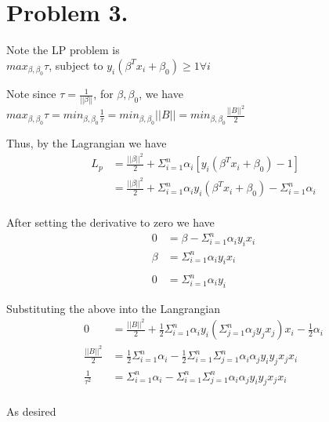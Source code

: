 \documentclass[paper=a4, fontsize=11pt]{scrartcl} %
\numberwithin{equation}{section} %
\numberwithin{figure}{section} %
\numberwithin{table}{section} %
\begin{document}
\section*{Problem 3.}
Note the LP problem is \\
$max_{\beta, \beta_0} \tau$, subject to $y_i(\beta^{T} x_i + \beta_0) \geq 1 \forall i$

Note since $\tau = \frac{1}{||\beta||}$, for $\beta,\beta_0$, we have $max_{\beta, \beta_0} \tau = min_{\beta, \beta_0} \frac{1}{\tau} = min_{\beta, \beta_0} ||B|| = min_{\beta, \beta_0} \frac{||B||^2}{2}$ 

Thus, by the Lagrangian we have
\begin{align*}
	L_p &= \frac{||\beta||^2}{2} + \Sigma_{i=1}^{n} \alpha_i [ y_i (\beta^{T} x_i + \beta_0) - 1 ] \\
	&= \frac{||\beta||^2}{2} + \Sigma_{i=1}^{n} \alpha_i y_i (\beta^{T} x_i + \beta_0) - \Sigma_{i=1}^{n} \alpha_i  \\
\end{align*}

After setting the derivative to zero we have \\
\begin{align*}
0 &=\beta - \Sigma_{i=1}^{n} \alpha_i  y_i x_i \\
\beta &= \Sigma_{i=1}^{n} \alpha_i  y_i x_i \\
\\
0 &= \Sigma_{i=1}^{n} \alpha_i  y_i
\end{align*}

Substituting the above into the Langrangian
\begin{align*}
0  &= \frac{||B||^2}{2} +  \frac{1}{2} \Sigma_{i=1}^{n} \alpha_i y_i (\Sigma_{j=1}^{n} \alpha_j  y_j x_j )x_i - \frac{1}{2}\alpha_i \\
\frac{||B||^2}{2} &=  \frac{1}{2} \Sigma_{i=1}^{n} \alpha_i -  \frac{1}{2} \Sigma_{i=1}^{n} \Sigma_{j=1}^{n}  \alpha_i \alpha_j  y_i y_j x_j x_i  \\
\frac{1}{\tau^2} &=  \Sigma_{i=1}^{n}\alpha_i -   \Sigma_{i=1}^{n} \Sigma_{j=1}^{n}  \alpha_i \alpha_j  y_i y_j x_j x_i  \\
\end{align*}

As desired
\end{document}
